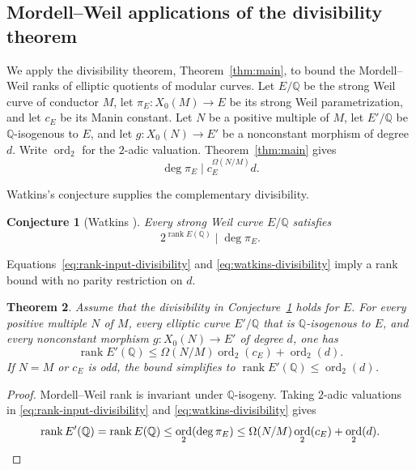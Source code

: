 \documentclass[12pt, letterpaper]{amsart}
\newtheorem{theorem}{Theorem}[section]
\newtheorem{conjecture}[theorem]{Conjecture}
\theoremstyle{definition}
\theoremstyle{remark}
\newcommand{\Q}{\mathbb Q}
\DeclareMathOperator{\ord}{ord}
\numberwithin{equation}{section}
\begin{document}
\subsection{Mordell--Weil applications of the divisibility theorem}
\label{subsec:rank-consequences}

We apply the divisibility theorem, Theorem~\ref{thm:main}, to bound the
Mordell--Weil ranks of elliptic quotients of modular curves. Let \(E/\Q\) be
the strong Weil curve of conductor
\(M\), let \(\pi_E:X_0(M)\to E\) be its strong Weil parametrization, and let
\(c_E\) be its Manin constant. Let \(N\) be a positive multiple of \(M\), let
\(E'/\Q\) be \(\Q\)-isogenous to \(E\), and let
\(g:X_0(N)\to E'\) be a nonconstant morphism of degree \(d\). Write \(\ord_2\)
for the \(2\)-adic valuation. Theorem~\ref{thm:main} gives
\begin{equation}\label{eq:rank-input-divisibility}
                  \deg\pi_E\mid c_E^{\Omega(N/M)}d.
\end{equation}

Watkins's conjecture supplies the complementary divisibility.

\begin{conjecture}[Watkins \cite{Watkins}]\label{conj:watkins}
Every strong Weil curve \(E/\Q\) satisfies
\begin{equation}\label{eq:watkins-divisibility}
        2^{\operatorname{rank}E(\Q)}\mid\deg\pi_E.
\end{equation}
\end{conjecture}

Equations~\eqref{eq:rank-input-divisibility} and
\eqref{eq:watkins-divisibility} imply a rank bound with no parity restriction
on \(d\).

\begin{theorem}\label{thm:watkins-rank-bound}
Assume that the divisibility in Conjecture~\ref{conj:watkins} holds for
\(E\). For every positive multiple \(N\) of \(M\), every elliptic curve
\(E'/\Q\) that is \(\Q\)-isogenous to \(E\), and every nonconstant morphism
\(g:X_0(N)\to E'\) of degree \(d\), one has
\begin{equation}\label{eq:watkins-rank-bound}
 \operatorname{rank}E'(\Q)
 \leq \Omega(N/M)\ord_2(c_E)+\ord_2(d).
\end{equation}
If \(N=M\) or \(c_E\) is odd, the bound simplifies to
\(\operatorname{rank}E'(\Q)\leq\ord_2(d)\).
\end{theorem}

\begin{proof}
Mordell--Weil rank is invariant under \(\Q\)-isogeny. Taking \(2\)-adic
valuations in \eqref{eq:rank-input-divisibility} and
\eqref{eq:watkins-divisibility} gives
\[
 \operatorname{rank}E'(\Q)
 =\operatorname{rank}E(\Q)
 \leq\ord_2(\deg\pi_E)
 \leq\Omega(N/M)\ord_2(c_E)+\ord_2(d).\qedhere
\]
\end{proof}
\end{document}
